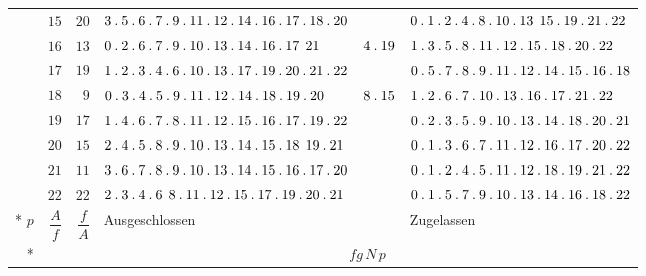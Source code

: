 \begin{longtable}{r|r|r|p{125pt}|p{28pt}|p{125pt}}
 & $15$ & $20$ & $3\pdot 5\pdot 6\pdot 7\pdot 9\pdot 11\pdot 12\pdot 14\pdot 16\pdot 17\pdot 18\pdot 20$ &  & $0\pdot 1\pdot 2\pdot 4\pdot 8\pdot 10\pdot 13\mspace{8mu}15\pdot 19\pdot 21\pdot 22$\\
 & $16$ & $13$ & $0\pdot 2\pdot 6\pdot 7\pdot 9\pdot 10\pdot 13\pdot 14\pdot 16\pdot 17\mspace{8mu}21$ & $4\pdot 19$ & $1\pdot 3\pdot 5\pdot 8\pdot 11\pdot 12\pdot 15\pdot 18\pdot 20\pdot 22$\\
 & $17$ & $19$ & $1\pdot 2\pdot 3\pdot 4\pdot 6\pdot 10\pdot 13\pdot 17\pdot 19\pdot 20\pdot 21\pdot 22$ &  & $0\pdot 5\pdot 7\pdot 8\pdot 9\pdot 11\pdot 12\pdot 14\pdot 15\pdot 16\pdot 18$\\
 & $18$ & $9$ & $0\pdot 3\pdot 4\pdot 5\pdot 9\pdot 11\pdot 12\pdot 14\pdot 18\pdot 19\pdot 20$ & $8\pdot 15$ & $1\pdot 2\pdot 6\pdot 7\pdot 10\pdot 13\pdot 16\pdot 17\pdot 21\pdot 22$\\
 & $19$ & $17$ & $1\pdot 4\pdot 6\pdot 7\pdot 8\pdot 11\pdot 12\pdot 15\pdot 16\pdot 17\pdot 19\pdot 22$ &  & $0\pdot 2\pdot 3\pdot 5\pdot 9\pdot 10\pdot 13\pdot 14\pdot 18\pdot 20\pdot 21$\\
 & $20$ & $15$ & $2\pdot 4\pdot 5\pdot 8\pdot 9\pdot 10\pdot 13\pdot 14\pdot 15\pdot 18\mspace{8mu}19\pdot 21$ &  & $0\pdot 1\pdot 3\pdot 6\pdot 7\pdot 11\pdot 12\pdot 16\pdot 17\pdot 20\pdot 22$\\
 & $21$ & $11$ & $3\pdot 6\pdot 7\pdot 8\pdot 9\pdot 10\pdot 13\pdot 14\pdot 15\pdot 16\pdot 17\pdot 20$ &  & $0\pdot 1\pdot 2\pdot 4\pdot 5\pdot 11\pdot 12\pdot 18\pdot 19\pdot 21\pdot 22$\\
 & $22$ & $22$ & $2\pdot 3\pdot 4\pdot 6\mspace{8mu}8\pdot 11\pdot 12\pdot 15\pdot 17\pdot 19\pdot 20\pdot 21$ &  & $0\pdot 1\pdot 5\pdot 7\pdot 9\pdot 10\pdot 13\pdot 14\pdot 16\pdot 18\pdot 22$\\*
\hline
$p$ & $\dfrac{A}{f}$ & $\dfrac{f}{A}$ & Ausgeschlossen & & Zugelassen\\*\cline{4-4}\cline{6-6}
& & & \multicolumn{3}{c}{$fg\,N\,p$}\\
\end{longtable}\endgroup
